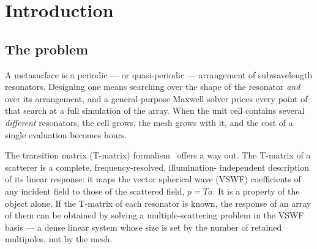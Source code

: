 \documentclass[11pt,a4paper]{article}
\theoremstyle{plain}
\theoremstyle{definition}
\begin{document}
\begin{abstract}
Finally we prove that the deficiency cannot be repaired by any modification
confined to the aggregation stage: because the stored T-matrix is band-limited
to $l \le L$, the solution of the multiple-scattering problem depends on the
lattice coupling operator only through its $l \le L$ block, so extending that
operator to higher order changes nothing at all --- and the $l \le L$ block it
does see is already converged to $10^{-14}$. The information that is missing is
missing from the \emph{representation of the atom}. We quantify the one representational change that restores convergence, a
distributed multi-centre expansion for which
$\rho_{\text{sub}} = 2r_s/(g + 2r_s)$ becomes a design parameter rather than a
fixed property of the geometry; priced at equal accuracy it costs
$\sim\!10^{3}$ modes per atom against $30$ today, which leaves the solve
comfortable and moves the burden onto the extraction. We specify the
corresponding changes on both sides of the pipeline.
\end{abstract}

\tableofcontents
\bigskip

\section{Introduction}

\subsection{The problem}

A metasurface is a periodic --- or quasi-periodic --- arrangement of
subwavelength resonators. Designing one means searching over the shape of the
resonator \emph{and} over its arrangement, and a general-purpose Maxwell solver
prices every point of that search at a full simulation of the array. When the
unit cell contains several \emph{different} resonators, the cell grows, the mesh
grows with it, and the cost of a single evaluation becomes hours.

The transition matrix (T-matrix) formalism~\cite{waterman1965} offers a way out.
The T-matrix of a scatterer is a complete, frequency-resolved, illumination-%
independent description of its linear response: it maps the vector spherical
wave (VSWF) coefficients of any incident field to those of the scattered field,
$p = T a$. It is a property of the object alone. If the T-matrix of each
resonator is known, the response of an array of them can be obtained by solving
a multiple-scattering problem in the VSWF basis --- a dense linear system whose
size is set by the number of retained multipoles, not by the mesh.
\end{document}
